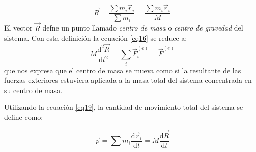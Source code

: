 \documentclass[../main]{subfiles}
\begin{document}
    \begin{equation}
        \vec{R}=\dfrac{\sum m_i \vec{r}_i}{\sum m_i}=\dfrac{\sum m_i \vec{r}_i}{M}
        \label{eq18}
    \end{equation}
El vector $\vec{R}$ defne un punto llamado \textit{centro de masa} o \textit{centro de gravedad} del sistema. Con esta definición la ecuación \eqref{eq16} se reduce a:
    \begin{equation}
        M\dfrac{\text{d}^2\vec{R}}{\text{d}t^2}=\sum_i \vec{F}_i^{(e)}=\vec{F}^{(e)}
        \label{eq19}
    \end{equation}
que nos expresa que el centro de masa se mueva como si la resultante de las fuerzas exteriores estuviera aplicada a la masa total del sistema concentrada en su centro de masa. 
    
    \vspace{0.2cm}
    Utilizando la ecuación \eqref{eq19}, la cantidad de movimiento total del sistema se define como:
    
    \begin{equation}
        \vec{p}=\sum m_i \dfrac{\text{d} \vec{r}_i}{\text{d}t}=M \dfrac{\text{d}\vec{R}}{\text{d}t}
        \label{eq20}
    \end{equation}
\end{document}
